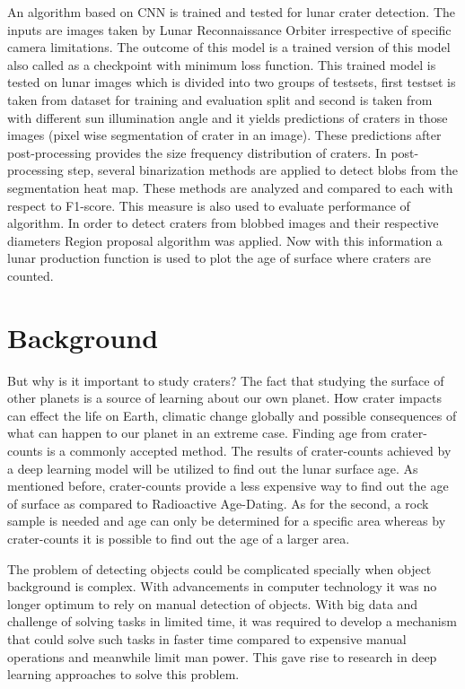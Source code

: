 \documentclass[11pt]{article}
\begin{document}
An algorithm based on CNN is trained and tested for lunar crater detection. The inputs are images taken by Lunar Reconnaissance Orbiter irrespective of specific camera limitations. The outcome of this model is a trained version of this model also called as a checkpoint with minimum loss function. This trained model is tested on lunar images which is divided into two groups of testsets, first testset is taken from dataset for training and evaluation split and second is taken from \cite{dino2020} with different sun illumination angle and it yields predictions of craters in those images (pixel wise segmentation of crater in an image). These predictions after post-processing provides the size frequency distribution of craters. In post-processing step, several binarization methods are applied to detect blobs from the segmentation heat map. These methods are analyzed and compared to each with respect to F1-score. This measure is also used to evaluate performance of algorithm. In order to detect craters from blobbed images and their respective diameters Region proposal algorithm was applied. Now with this information a lunar production function is used to plot the age of surface where craters are counted.

\section{Background}
But why is it important to study craters? The fact that studying the surface of other planets is a source of learning about our own planet. How crater impacts can effect the life on Earth, climatic change globally and possible consequences of what can happen to our planet in an extreme case. Finding age from crater-counts is a commonly accepted method. The results of crater-counts achieved by a deep learning model will be utilized to find out the lunar surface age. As mentioned before, crater-counts provide a less expensive way to find out the age of surface as compared to Radioactive Age-Dating. As for the second, a rock sample is needed and age can only be determined for a specific area whereas by crater-counts it is possible to find out the age of a larger area.

The problem of detecting objects could be complicated specially when object background is complex. With advancements in computer technology it was no longer optimum to rely on manual detection of objects. With big data and challenge of solving tasks in limited time, it was required to develop a mechanism that could solve such tasks in faster time compared to expensive manual operations and meanwhile limit man power. This gave rise to research in deep learning approaches to solve this problem.
\end{document}

